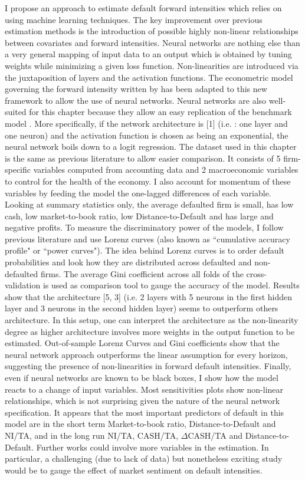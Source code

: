 I propose an approach to estimate default forward intensities which relies on using machine learning techniques. The key improvement over previous estimation methods is the introduction of possible highly non-linear relationships between covariates and forward intensities. Neural networks are nothing else than a very general mapping of input data to an output which is obtained by tuning weights while minimizing a given loss function. Non-linearities are introduced via the juxtaposition of layers and the activation functions. The econometric model governing the forward intensity written by \citet{Duan2012} has been adapted to this new framework to allow the use of neural networks. Neural networks are also well-suited for this chapter because they allow an easy replication of the benchmark model \citet{Duan2012}. More specifically, if the network architecture is [1] (i.e. : one layer and one neuron) and the activation function is chosen as being an exponential, the neural network boils down to a logit regression. The dataset used in this chapter is the same as previous literature to allow easier comparison. It consists of 5 firm-specific variables computed from accounting data and 2 macroeconomic variables to control for the health of the economy. I also account for momentum of these variables by feeding the model the one-lagged differences of each variable. Looking at summary statistics only, the average defaulted firm is small, has low cash, low market-to-book ratio, low Distance-to-Default and has large and negative profits. To measure the discriminatory power of the models, I follow previous literature and use Lorenz curves (also known as ``cumulative accuracy profile" or ``power curves"). The idea behind Lorenz curves is to order default probabilities and look how they are distributed across defaulted and non-defaulted firms. The average Gini coefficient across all folds of the cross-validation is used as comparison tool to gauge the accuracy of the model. Results show that the architecture [5, 3] (i.e. 2 layers with 5 neurons in the first hidden layer and 3 neurons in the second hidden layer) seems to outperform others architecture. In this setup, one can interpret the architecture as the non-linearity degree as higher architecture involves more weights in the output function to be estimated. Out-of-sample Lorenz Curves and Gini coefficients show that the neural network approach outperforms the linear assumption for every horizon, suggesting the presence of non-linearities in forward default intensities. Finally, even if neural networks are known to be black boxes, I show how the model reacts to a change of input variables. Most sensitivities plots show non-linear relationships, which is not surprising given the nature of the neural network specification. It appears that the most important predictors of default in this model are in the short term Market-to-book ratio, Distance-to-Default and NI/TA, and in the long run NI/TA, CASH/TA, $\Delta$CASH/TA and Distance-to-Default. Further works could involve more variables in the estimation. In particular, a challenging (due to lack of data) but nonetheless exciting study would be to gauge the effect of market sentiment on default intensities.



